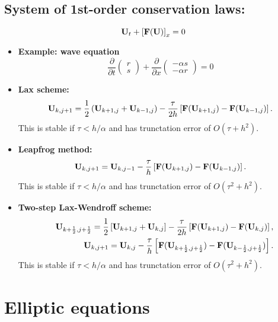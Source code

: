 \documentclass[12pt]{article}
\newcommand\pr{\partial}
\begin{document}
\subsection*{System of 1st-order conservation laws:}

\[
{\bf U}_{t} + \left[{\bf F}({\bf U})\right]_{x} =0
\]


\begin{itemize}

\item \textbf{Example: wave equation}
\[
\frac{\pr}{\pr t}
\left(
\begin{array}{c}
r \\
s
\end{array}
\right) +
\frac{\pr}{\pr x}
\left(
\begin{array}{c}
-\alpha s \\
-\alpha r
\end{array}
\right)=0
\]


\item \textbf{Lax scheme:}
\[
{\bf U}_{k,j+1}=\frac{1}{2}\left({\bf U}_{k+1,j}+{\bf U}_{k-1,j}\right) -\frac{\tau}{2h}
\left[{\bf F}({\bf U}_{k+1,j})-{\bf F}({\bf U}_{k-1,j})\right].
\]
This is stable if $\tau < h/\alpha$ and has trunctation error of $O(\tau+h^2)$.

\item \textbf{Leapfrog method:}
\[
{\bf U}_{k,j+1}={\bf U}_{k,j-1} -\frac{\tau}{h}
\left[{\bf F}({\bf U}_{k+1,j})-{\bf F}({\bf U}_{k-1,j})\right].
\]
This is stable if $\tau < h/\alpha$ and has trunctation error of $O(\tau^2+h^2)$.

\item \textbf{Two-step Lax-Wendroff scheme:}
\begin{eqnarray*}
&&{\bf U}_{k+\frac{1}{2},j+\frac{1}{2}}=\frac{1}{2}\left[{\bf U}_{k+1,j}+{\bf U}_{k,j}\right] -
\frac{\tau}{2h}\left[{\bf F}({\bf U}_{k+1,j})-{\bf F}({\bf U}_{k,j})\right], \nonumber \\
&&{\bf U}_{k,j+1}={\bf U}_{k,j}-
\frac{\tau}{h}\left[{\bf F}({\bf U}_{k+\frac{1}{2},j+\frac{1}{2}})-
{\bf F}({\bf U}_{k-\frac{1}{2},j+\frac{1}{2}})\right]. \label{p17}
\end{eqnarray*}
This is stable if $\tau < h/\alpha$ and has trunctation error of $O(\tau^2+h^2)$.

\end{itemize}

\section*{Elliptic equations}
\end{document}
